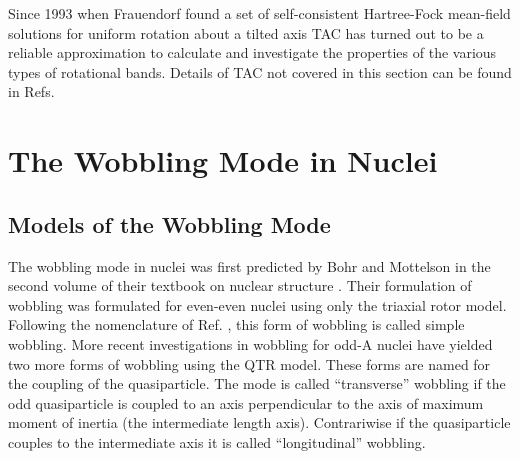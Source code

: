 Since 1993 when Frauendorf found a set of self-consistent Hartree-Fock mean-field solutions for uniform rotation about a tilted axis \cite{frauendorfTiltedCranking} TAC has turned out to be a reliable approximation to calculate and investigate the properties of the various types of rotational bands. Details of TAC not covered in this section can be found in Refs. \cite{frauendorfTiltedCranking,frauendorfTACMultiQPBands,frauendorfChirality,frauendorfTAC}

\section{The Wobbling Mode in Nuclei}
\label{sec:models-wobbling-mode}
\subsection{Models of the Wobbling Mode}
\label{ssec:models-wobbling-models}
The wobbling mode in nuclei was first predicted by Bohr and Mottelson in the second volume of their textbook on nuclear structure \cite{bohrMottelson2}. Their formulation of wobbling was formulated for even-even nuclei using only the triaxial rotor model. Following the nomenclature of Ref. \cite{frauendorfTransverseWobbling}, this form of wobbling is called simple wobbling. More recent investigations \cite{frauendorfTransverseWobbling} in wobbling for odd-A nuclei have yielded two more forms of wobbling using the QTR model. These forms are named for the coupling of the quasiparticle. The mode is called ``transverse'' wobbling if the odd quasiparticle is coupled to an axis perpendicular to the axis of maximum moment of inertia (the intermediate length axis). Contrariwise if the quasiparticle couples to the intermediate axis it is called ``longitudinal'' wobbling.
